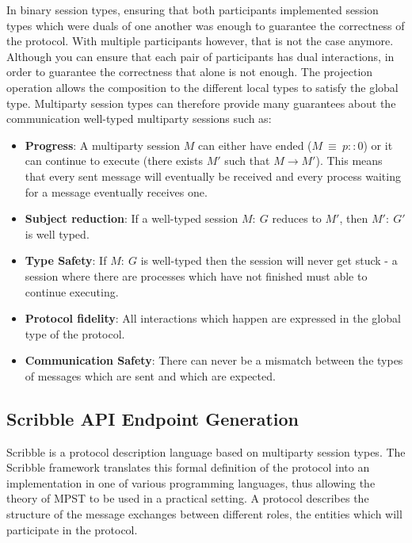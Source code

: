 \documentclass[12pt,twoside]{report}
\begin{document}
In binary session types, ensuring that both participants implemented session types which were duals of one another was enough to guarantee the correctness of the protocol. With multiple participants however, that is not the case anymore. Although you can ensure that each pair of participants has dual interactions, in order to guarantee the correctness that alone is not enough. The projection operation allows the composition to the different local types to satisfy the global type. Multiparty session types can therefore provide many guarantees about the communication well-typed multiparty sessions such as:
\begin{itemize}
    \item \textbf{Progress}: A multiparty session $M$ can either have ended ($M\ \equiv\ p :: 0$) or it can continue to execute (there exists $M'$ such that $M \longrightarrow M'$). This means that every sent message will eventually be received and every process waiting for a message eventually receives one. \cite{verygentleintrotompst, gentleintrotompst}
    \item \textbf{Subject reduction}: If a well-typed session $M:\ G$ reduces to $M'$, then $M':\ G'$ is well typed\cite{verygentleintrotompst}.
    \item \textbf{Type Safety}: If $M:\ G$ is well-typed then the session will never get stuck - a session where there are processes which have not finished must able to continue executing\cite{verygentleintrotompst}.
    \item \textbf{Protocol fidelity}: All interactions which happen are expressed in the global type of the protocol\cite{gentleintrotompst}.
    \item \textbf{Communication Safety}: There can never be a mismatch between the types of messages which are sent and which are expected\cite{gentleintrotompst}.
\end{itemize}{}

\subsection{Scribble API Endpoint Generation}\label{Scribble}
Scribble\cite{scribble,featherweight} is a protocol description language based on multiparty session types. The Scribble framework translates this formal definition of the protocol into an implementation in one of various programming languages, thus allowing the theory of MPST to be used in a practical setting. A protocol describes the structure of the message exchanges between different roles, the entities which will participate in the protocol.\\
\end{document}
